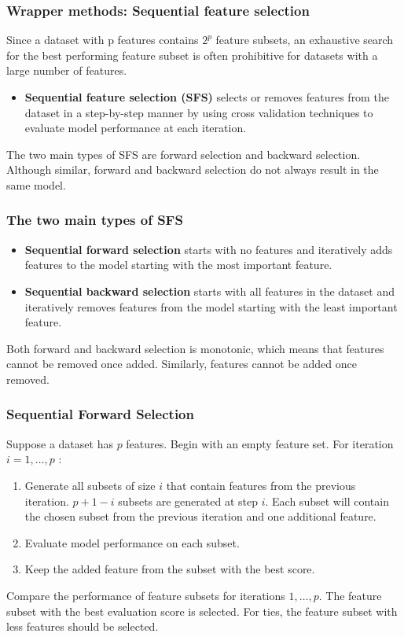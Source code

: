 \documentclass[8pt,dvipsnames]{beamer}
\begin{document}
\begin{frame}
    \frametitle{Wrapper methods: Sequential feature selection}
    Since a dataset with p features contains \(2^{p}\) feature subsets, an exhaustive search for the best performing feature subset is often prohibitive
    for datasets with a large number of features.
    \begin{itemize}
        \item \textbf{Sequential feature selection (SFS)} selects or removes features from the dataset in a step-by-step manner by using cross validation techniques to evaluate model performance at each iteration.
    \end{itemize}
    The two main types of SFS are forward selection and backward selection. Although similar, forward and backward selection do not always result in the same model.
\end{frame}
\begin{frame}
    \frametitle{The two main types of SFS}
    \begin{itemize}
        \item \textbf{Sequential forward selection} starts with no features and iteratively adds features to the model starting with the most important feature.
        \item \textbf{Sequential backward selection} starts with all features in the dataset and iteratively removes features from the model starting with the least important feature.
    \end{itemize}
    Both forward and backward selection is monotonic, which means that features cannot be removed once added. Similarly, features cannot be added once removed.
\end{frame}

\begin{frame}
    \frametitle{Sequential Forward Selection}
    Suppose a dataset has \(p\) features. Begin with an empty feature set. For iteration \(i=1, \ldots, p\) :
    \begin{enumerate}
        \item Generate all subsets of size \(i\) that contain features from the previous iteration. \(p+1-i\) subsets are generated at step \(i\). Each
              subset will contain the chosen subset from the previous iteration and one additional feature.
        \item Evaluate model performance on each subset.
        \item Keep the added feature from the subset with the best score.
    \end{enumerate}
    Compare the performance of feature subsets for iterations \(1, \ldots, p\). The feature subset with the best evaluation score is selected. For
    ties, the feature subset with less features should be selected.
\end{frame}
\end{document}
